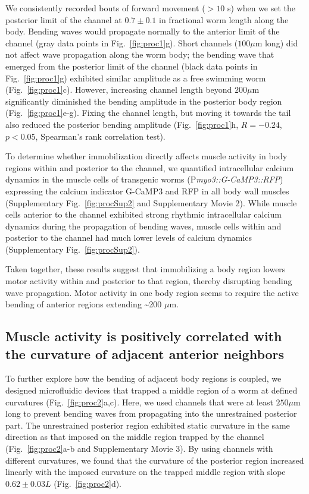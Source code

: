 We consistently recorded bouts of forward movement ($> 10$ s) when we set the posterior limit of 
the channel at $0.7 \pm 0.1$ in fractional worm length along the body. Bending waves would 
propagate normally to the anterior limit of the channel (gray data points in Fig.~\ref{fig:proc1}g). Short 
channels ($100 \mu$m long) did not affect wave propagation along the worm body; the bending wave 
that emerged from the posterior limit of the channel (black data points in Fig.~\ref{fig:proc1}g) exhibited 
similar amplitude as a free swimming worm (Fig.~\ref{fig:proc1}c). However, increasing channel length 
beyond $200 \mu$m significantly diminished the bending amplitude in the posterior body region (Fig.~\ref{fig:proc1}e-g). Fixing the channel length, but moving it towards the tail also reduced the posterior 
bending amplitude (Fig.~\ref{fig:proc1}h, $R = -0.24$, $p < 0.05$, Spearman’s rank correlation test).

To determine whether immobilization directly affects muscle activity in body regions within and 
posterior to the channel, we quantified intracellular calcium dynamics in the muscle cells of 
transgenic worms (P\textit{myo3::G-CaMP3::RFP}) expressing the calcium indicator G-CaMP3 \citep{tian_imaging_2009} and RFP in all body wall muscles (Supplementary Fig.~\ref{fig:procSup2} and Supplementary Movie 2). While 
muscle cells anterior to the channel exhibited strong rhythmic intracellular calcium dynamics 
during the propagation of bending waves, muscle cells within and posterior to the channel had 
much lower levels of calcium dynamics (Supplementary Fig.~\ref{fig:procSup2}).

Taken together, these results suggest that immobilizing a body region lowers motor activity 
within and posterior to that region, thereby disrupting bending wave propagation. Motor activity 
in one body region seems to require the active bending of anterior regions extending \textasciitilde200 $\mu$m.

\subsection{Muscle activity is positively correlated with the curvature of adjacent anterior 
neighbors}
 
To further explore how the bending of adjacent body regions is coupled, we designed 
microfluidic devices that trapped a middle region of a worm at defined curvatures (Fig.~\ref{fig:proc2}a,c). 
Here, we used channels that were at least $250 \mu$m long to prevent bending waves from 
propagating into the unrestrained posterior part. The unrestrained posterior region exhibited 
static curvature in the same direction as that imposed on the middle region trapped by the 
channel (Fig.~\ref{fig:proc2}a-b and Supplementary Movie 3). By using channels with different curvatures, we 
found that the curvature of the posterior region increased linearly with the imposed curvature on 
the trapped middle region with slope $0.62 \pm 0.03 L$ (Fig.~\ref{fig:proc2}d). 



